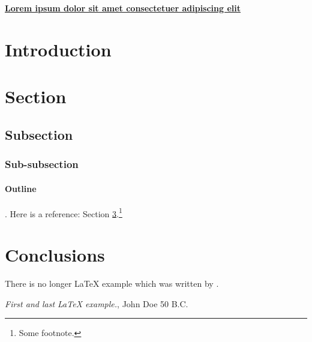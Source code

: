 \documentclass[11pt,a4paper,twoside]{article}
\begin{document}
\begin{center}
    \textbf{\underline{%
    Lorem ipsum dolor sit amet consectetuer adipiscing elit
    }}
\end{center}

\setcounter{tocdepth}{2}
\tableofcontents

\section{Introduction}

\lipsum[1-2]
\section{Section}
\subsection{Subsection}
\subsubsection{Sub-subsection}
\lipsum[3]
\paragraph{Outline}
\lipsum[4]. Here is a reference: Section \ref{conclusions}.\footnote{Some footnote.}

\section{Conclusions}\label{conclusions}
There is no longer \LaTeX{} example which was written by \cite{doe}.


\begin{thebibliography}{9}
 \emph{First and last \LaTeX{} example.},
John Doe 50 B.C. 
\end{thebibliography}
\end{document}
